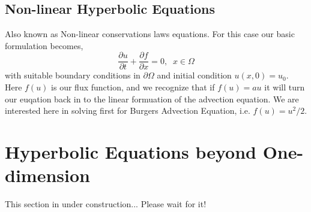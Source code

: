 \section{Non-linear Hyperbolic Equations}
Also known as Non-linear conservations laws equations. For this case our basic formulation becomes,
\begin{equation}
	\frac{\partial u}{\partial t} + \frac{\partial f}{\partial x} = 0, \;\; x \in \Omega
	\label{nonlinear_advection}
\end{equation}
with suitable boundary conditions in $\partial \Omega$ and initial condition $u(x,0) = u_0$. 
Here $f(u)$ is our flux function, and we recognize that if $f(u) = a u$ it will turn our euqation back in to the linear formuation of the advection equation. We are interested here in solving first for Burgers Advection Equation, i.e. $f(u) = u^2/2$.

\chapter{Hyperbolic Equations beyond One-dimension}
This section in under construction... Please wait for it!

